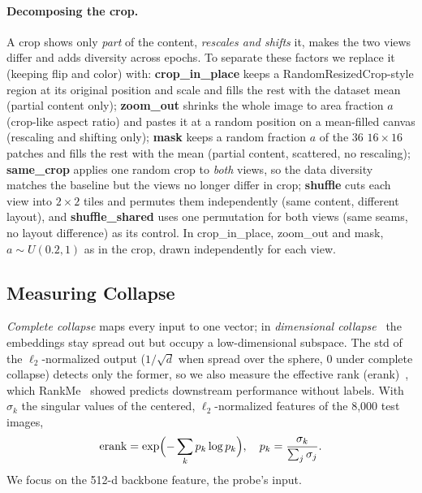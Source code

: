 \documentclass[10pt,twocolumn,letterpaper]{article}
\begin{document}
\paragraph{Decomposing the crop.}
A crop shows only \emph{part} of the content, \emph{rescales and shifts} it, makes the two views differ and adds diversity across epochs. To separate these factors we replace it (keeping flip and color) with:
\textbf{crop\_in\_place} keeps a RandomResizedCrop-style region at its original position and scale and fills the rest with the dataset mean (partial content only);
\textbf{zoom\_out} shrinks the whole image to area fraction $a$ (crop-like aspect ratio) and pastes it at a random position on a mean-filled canvas (rescaling and shifting only);
\textbf{mask} keeps a random fraction $a$ of the 36 $16\!\times\!16$ patches and fills the rest with the mean (partial content, scattered, no rescaling);
\textbf{same\_crop} applies one random crop to \emph{both} views, so the data diversity matches the baseline but the views no longer differ in crop;
\textbf{shuffle} cuts each view into $2\!\times\!2$ tiles and permutes them independently (same content, different layout), and \textbf{shuffle\_shared} uses one permutation for both views (same seams, no layout difference) as its control.
In crop\_in\_place, zoom\_out and mask, $a\sim U(0.2,1)$ as in the crop, drawn independently for each view.

\subsection{Measuring Collapse}
\emph{Complete collapse} maps every input to one vector; in \emph{dimensional collapse}~\cite{hua2021feature,jing2022dimensional} the embeddings stay spread out but occupy a low-dimensional subspace.
The std of the $\ell_2$-normalized output ($1/\sqrt{d}$ when spread over the sphere, $0$ under complete collapse) detects only the former, so we also measure the effective rank (erank)~\cite{roy2007erank}, which RankMe~\cite{garrido2023rankme} showed predicts downstream performance without labels.
With $\sigma_k$ the singular values of the centered, $\ell_2$-normalized features of the 8,000 test images,
\begin{equation}
\text{erank}=\exp\Bigl(-\sum_k p_k\log p_k\Bigr),\quad p_k=\frac{\sigma_k}{\sum_j\sigma_j}.
\end{equation}
We focus on the 512-d backbone feature, the probe's input.

\end{document}
